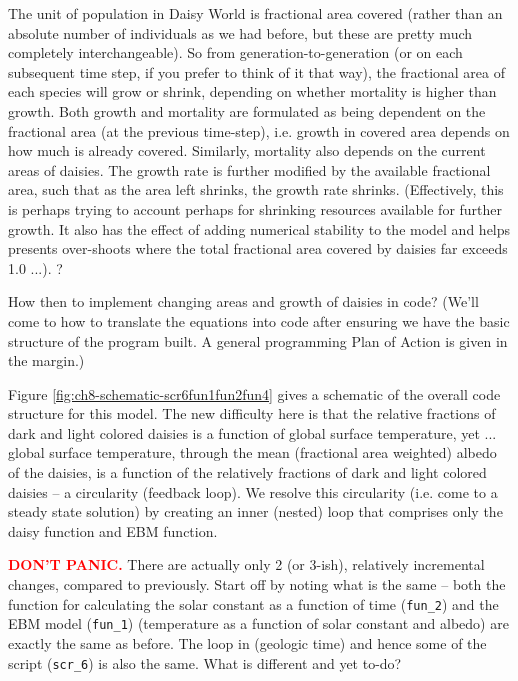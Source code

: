 \documentclass{tufte-book} %
\begin{document}
The unit of population in Daisy World is fractional area covered (rather than an absolute number of individuals as we had before, but these are pretty much completely interchangeable). So from generation-to-generation (or on each subsequent time step, if you prefer to think of it that way), the fractional area of each species will grow or shrink, depending on whether mortality is higher than growth. Both growth and mortality are formulated as being dependent on the fractional area (at the previous time-step), i.e. growth in covered area depends on how much is already covered. Similarly, mortality also depends on the current areas of daisies. The growth rate is further modified by the available fractional area, such that as the area left shrinks, the growth rate shrinks. (Effectively, this is perhaps trying to account perhaps for shrinking resources available for further growth. It also has the effect of adding numerical stability to the model and helps presents over-shoots where the total fractional area covered by daisies far exceeds 1.0 ...). 
?

How then to implement changing areas and growth of daisies in code? (We'll come to how to translate the equations into code after ensuring we have the basic structure of the program built. A general programming Plan of Action is given in the margin.)

Figure \ref{fig:ch8-schematic-scr6fun1fun2fun4} gives a schematic of the overall code structure for this model. The new difficulty here is that the relative fractions of dark and light colored daisies is a function of global surface temperature, yet ... global surface temperature, through the mean (fractional area weighted) albedo of the daisies, is a function of the relatively fractions of dark and light colored daisies -- a circularity (feedback loop). We resolve this circularity (i.e. come to a steady state solution) by creating an inner (nested) loop that comprises only the daisy function and EBM function.

\textbf{\textcolor{red}{DON'T PANIC.}} There are actually only 2 (or 3-ish), relatively incremental changes, compared to previously. Start off by noting what is the same -- both the function for calculating the solar constant as a function of time (\texttt{fun\_2}) and the EBM model (\texttt{fun\_1}) (temperature as a function of solar constant and albedo) are exactly the same as before. The loop in (geologic time) and hence some of the script (\texttt{scr\_6}) is also the same. What is different and yet to-do?
\end{document}
